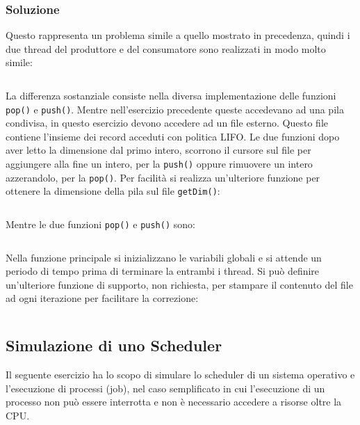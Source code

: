 \documentclass{article}
\numberwithin{equation}{subsection}
\begin{document}
\subsubsection*{Soluzione}

Questo rappresenta un problema simile a quello mostrato in precedenza, quindi i due thread del produttore e del consumatore sono realizzati in modo molto simile:
\inputminted[firstline=106, lastline=145, breaklines, breakanywhere, autogobble]{c}{./Programmazione Concorrente/produttore_consumatore_file.c}

La differenza sostanziale consiste nella diversa implementazione delle funzioni \verb|pop()| e \verb|push()|. Mentre nell'esercizio precedente queste accedevano ad una pila condivisa, in questo esercizio devono accedere ad un file esterno. Questo file contiene l'insieme dei record acceduti con politica LIFO. Le due funzioni dopo aver letto la dimensione dal primo intero, scorrono il cursore sul file per aggiungere alla fine un intero, per la \verb|push()| oppure rimuovere un intero azzerandolo, per la \verb|pop()|. Per facilità si realizza un'ulteriore funzione per ottenere la dimensione della pila sul file \verb|getDim()|:
\inputminted[firstline=37, lastline=46, breaklines, breakanywhere]{c}{./Programmazione Concorrente/produttore_consumatore_file.c}
Mentre le due funzioni \verb|pop()| e \verb|push()| sono:

\inputminted[firstline=64, lastline=104, breaklines, breakanywhere]{c}{./Programmazione Concorrente/produttore_consumatore_file.c}
Nella funzione principale si inizializzano le variabili globali e si attende un periodo di tempo prima di terminare la entrambi i thread. 
Si può definire un'ulteriore funzione di supporto, non richiesta, per stampare il contenuto del file ad ogni iterazione per facilitare la correzione:
\inputminted[firstline=89, lastline=104, breaklines, breakanywhere]{c}{./Programmazione Concorrente/produttore_consumatore_file.c}

\subsection{Simulazione di uno Scheduler}

Il seguente esercizio ha lo scopo di simulare lo scheduler di un sistema operativo e l'esecuzione di processi (job), nel caso semplificato in cui l'esecuzione di un processo non può essere interrotta e non è necessario accedere a risorse oltre la CPU.
\end{document}
